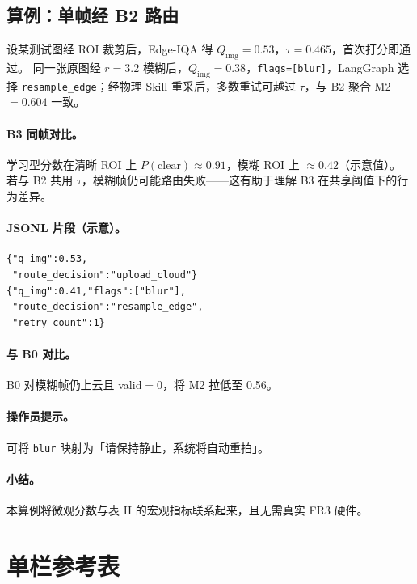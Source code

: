 \subsection{算例：单帧经 B2 路由}
\label{sec:walkthrough-zh}

设某测试图经 ROI 裁剪后，Edge-IQA 得 $Q_{\mathrm{img}}{=}0.53$，$\tau{=}0.465$，首次打分即通过。
同一张原图经 $r{=}3.2$ 模糊后，$Q_{\mathrm{img}}{=}0.38$，\texttt{flags=[blur]}，LangGraph 选择 \texttt{resample\_edge}；经物理 Skill 重采后，多数重试可越过 $\tau$，与 B2 聚合 M2$=0.604$ 一致。

\paragraph{B3 同帧对比。}
学习型分数在清晰 ROI 上 $P(\mathrm{clear}){\approx}0.91$，模糊 ROI 上 ${\approx}0.42$（示意值）。
若与 B2 共用 $\tau$，模糊帧仍可能路由失败——这有助于理解 B3 在共享阈值下的行为差异。

\paragraph{JSONL 片段（示意）。}
\begin{verbatim}
{"q_img":0.53,
 "route_decision":"upload_cloud"}
{"q_img":0.41,"flags":["blur"],
 "route_decision":"resample_edge",
 "retry_count":1}
\end{verbatim}

\paragraph{与 B0 对比。}
B0 对模糊帧仍上云且 valid$=0$，将 M2 拉低至 0.56。

\paragraph{操作员提示。}
可将 \texttt{blur} 映射为「请保持静止，系统将自动重拍」。

\paragraph{小结。}
本算例将微观分数与表 II 的宏观指标联系起来，且无需真实 FR3 硬件。

\onecolumn
\section{单栏参考表}
\label{sec:onecol-zh}


